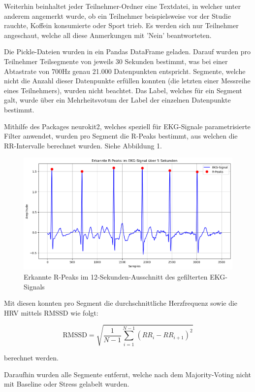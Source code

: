 Weiterhin beinhaltet jeder Teilnehmer-Ordner eine Textdatei, in welcher unter anderem angemerkt wurde, ob ein Teilnehmer beispielsweise vor der Studie rauchte, Koffein konsumierte oder Sport trieb. Es werden sich nur Teilnehmer angeschaut, welche all diese Anmerkungen mit 'Nein' beantworteten.

Die Pickle-Dateien wurden in ein Pandas DataFrame geladen. Darauf wurden pro Teilnehmer Teilsegmente von jeweils 30 Sekunden bestimmt, was bei einer Abtastrate von 700Hz genau 21.000 Datenpunkten entspricht. Segmente, welche nicht die Anzahl dieser Datenpunkte erfüllen konnten (die letzten einer Messreihe eines Teilnehmers), wurden nicht beachtet. Das Label, welches für ein Segment galt, wurde über ein Mehrheitsvotum der Label der einzelnen Datenpunkte bestimmt.

Mithilfe des Packages neurokit2, welches speziell für \ac{EKG}-Signale parametrisierte Filter anwendet, wurden pro Segment die R-Peaks bestimmt, aus welchen die RR-Intervalle berechnet wurden. Siehe Abbildung 1.

\begin{figure}[ht]
    \centering
    \includegraphics[width=1\textwidth]{Bilder/EKG-Plot.png}
    \caption{Erkannte R-Peaks im 12-Sekunden-Ausschnitt des gefilterten EKG-Signals}
    \label{fig:ekg-peaks}
\end{figure}

Mit diesen konnten pro Segment die durchschnittliche Herzfrequenz sowie die \ac{HRV} mittels \ac{RMSSD} wie folgt:

\[
\text{RMSSD} = \sqrt{\frac{1}{N-1} \sum_{i=1}^{N-1} (RR_i - RR_{i+1})^2}
\]

berechnet werden.

Daraufhin wurden alle Segmente entfernt, welche nach dem Majority-Voting nicht mit Baseline oder Stress gelabelt wurden.

